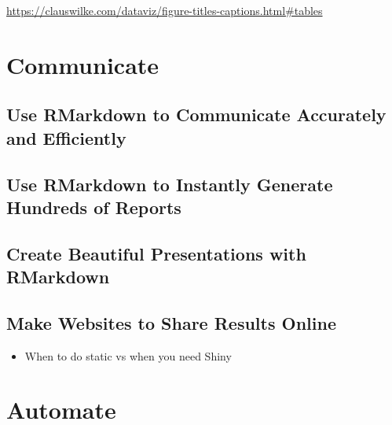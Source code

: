 \documentclass[
]{book}
\providecommand{\tightlist}{%
  \setlength{\itemsep}{0pt}\setlength{\parskip}{0pt}}
\begin{document}
\url{https://clauswilke.com/dataviz/figure-titles-captions.html\#tables}

\hypertarget{part-communicate}{%
\part*{Communicate}\label{part-communicate}}

\hypertarget{use-rmarkdown-to-communicate-accurately-and-efficiently}{%
\chapter*{Use RMarkdown to Communicate Accurately and Efficiently}\label{use-rmarkdown-to-communicate-accurately-and-efficiently}}

\hypertarget{use-rmarkdown-to-instantly-generate-hundreds-of-reports}{%
\chapter*{Use RMarkdown to Instantly Generate Hundreds of Reports}\label{use-rmarkdown-to-instantly-generate-hundreds-of-reports}}

\hypertarget{create-beautiful-presentations-with-rmarkdown}{%
\chapter*{Create Beautiful Presentations with RMarkdown}\label{create-beautiful-presentations-with-rmarkdown}}

\hypertarget{make-websites-to-share-results-online}{%
\chapter*{Make Websites to Share Results Online}\label{make-websites-to-share-results-online}}

\begin{itemize}
\tightlist
\item
  When to do static vs when you need Shiny
\end{itemize}

\hypertarget{part-automate}{%
\part*{Automate}\label{part-automate}}
\end{document}
